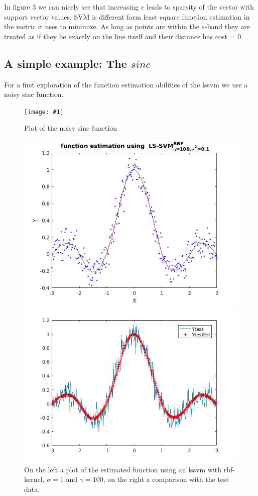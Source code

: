 \documentclass[•]{article}
\newcommand{\apicture}[2] {
  \begin{figure}[H]
  \centering
  \texttt{[image: \#1]}
  \caption{#2}
  \end{figure}
}
\begin{document}
In figure 3 we can nicely see that increasing $e$ leads to sparsity of the vector with support vector values. SVM is different form least-square function estimation in the metric it uses to minimize. As long as points are within the $e$-band they are treated as if they lie exactly on the line itself and their distance has cost = 0. 

\subsection{A simple example: The $sinc$}
For a first exploration of the function estimation abilities of the lssvm we use a noisy sinc function. 

\apicture{noisysinc.jpg}{Plot of the noisy sinc function}

\begin{figure}[H]
\centering
\begin{minipage}{.45\textwidth}
\includegraphics[width=.8\textwidth]{rbfestsinc.jpg}
\end{minipage}
\begin{minipage}{.45\textwidth}
\includegraphics[width=.8\textwidth]{rbfesttest.jpg}
\end{minipage}
\caption{On the left a plot of the estimated function using an lssvm with rbf-kernel, $\sigma = 1$ and $\gamma= 100$, on the right a comparison with the test data.}
\end{figure}
\end{document}
